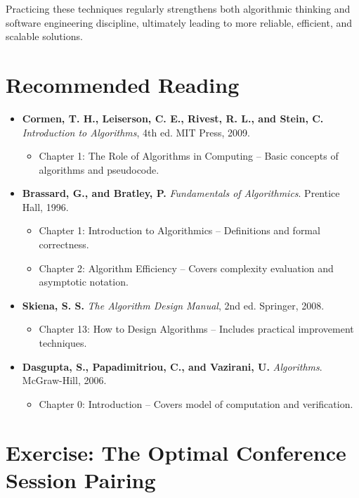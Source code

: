 \documentclass[12pt]{article}
\begin{document}
Practicing these techniques regularly strengthens both algorithmic thinking and software engineering discipline, ultimately leading to more reliable, efficient, and scalable solutions.


\section{Recommended Reading}
\begin{itemize}
\item \textbf{Cormen, T. H., Leiserson, C. E., Rivest, R. L., and Stein, C.}
\textit{Introduction to Algorithms}, 4th ed. MIT Press, 2009.
\begin{itemize}
\item Chapter 1: The Role of Algorithms in Computing – Basic concepts of algorithms and pseudocode.
\end{itemize}
\item \textbf{Brassard, G., and Bratley, P.}
\textit{Fundamentals of Algorithmics}. Prentice Hall, 1996.
\begin{itemize}
    \item Chapter 1: Introduction to Algorithmics – Definitions and formal correctness.
    \item Chapter 2: Algorithm Efficiency – Covers complexity evaluation and asymptotic notation.
\end{itemize}

\item \textbf{Skiena, S. S.}
\textit{The Algorithm Design Manual}, 2nd ed. Springer, 2008.
\begin{itemize}
    \item Chapter 13: How to Design Algorithms – Includes practical improvement techniques.
\end{itemize}

\item \textbf{Dasgupta, S., Papadimitriou, C., and Vazirani, U.}
\textit{Algorithms}. McGraw-Hill, 2006.
\begin{itemize}
    \item Chapter 0: Introduction – Covers model of computation and verification.
\end{itemize}
\end{itemize}

\section{Exercise: The Optimal Conference Session Pairing}
\end{document}

